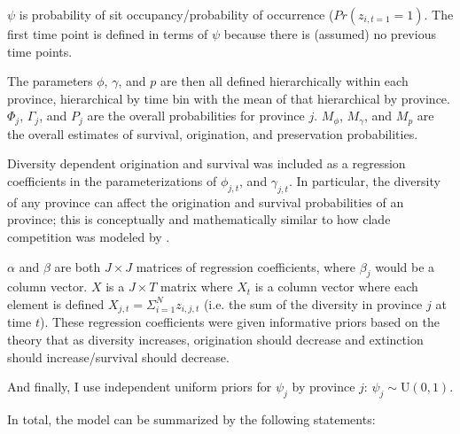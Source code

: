 \documentclass[12pt,letterpaper]{article}
\begin{document}
\(\psi\) is probability of sit occupancy/probability of occurrence (\(Pr(z_{i, t = 1} = 1)\). The first time point is defined in terms of \(\psi\) because there is (assumed) no previous time points.

The parameters \(\phi\), \(\gamma\), and \(p\) are then all defined hierarchically within each province, hierarchical by time bin with the mean of that hierarchical by province. \(\Phi_{j}\), \(\Gamma_{j}\), and \(P_{j}\) are the overall probabilities for province \(j\). \(M_{\phi}\), \(M_{\gamma}\), and \(M_{p}\) are the overall estimates of survival, origination, and preservation probabilities. 

Diversity dependent origination and survival was included as a regression coefficients in the parameterizations of \(\phi_{j, t}\), and \(\gamma_{j, t}\). In particular, the diversity of any province can affect the origination and survival probabilities of an province; this is conceptually and mathematically similar to how clade competition was modeled by \citet{Silvestro2015b}. 

\(\alpha\) and \(\beta\) are both \(J \times J\) matrices of regression coefficients, where \(\beta_{j}\) would be a column vector. \(X\) is a \(J \times T\) matrix where \(X_{t}\) is a column vector where each element is defined \(X_{j, t} = \Sigma_{i = 1}^{N} z_{i, j, t}\) (i.e. the sum of the diversity in province \(j\) at time \(t\)). These regression coefficients were given informative priors based on the theory that as diversity increases, origination should decrease and extinction should increase/survival should decrease.

And finally, I use independent uniform priors for \(\psi_{j}\) by province \(j\): \(\psi_{j} \sim \mathrm{U}(0, 1)\).

In total, the model can be summarized by the following statements:
\end{document}
